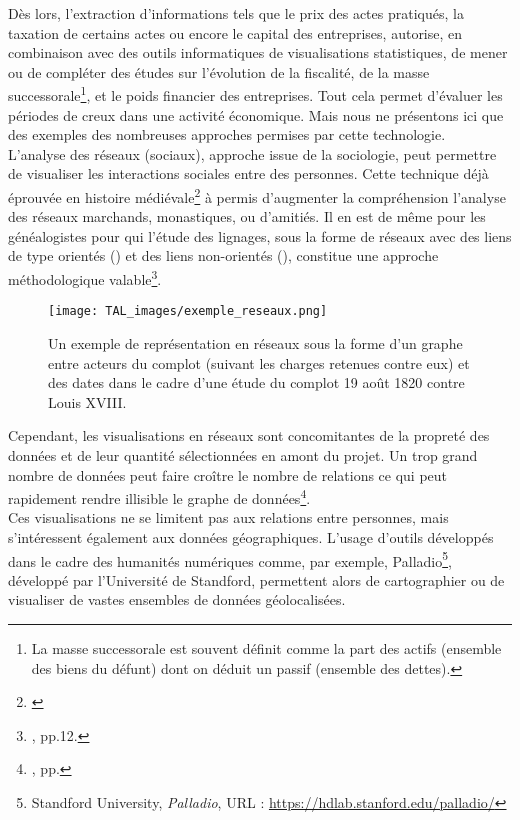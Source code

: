 Dès lors, l'extraction d'informations tels que le prix des actes pratiqués, la taxation de certains actes ou encore le capital des entreprises, autorise, en combinaison avec des outils informatiques de visualisations statistiques, de mener ou de compléter des études sur l'évolution de la fiscalité, de la masse successorale\footnote{La masse successorale est souvent définit comme la part des actifs (ensemble des biens du défunt) dont on déduit un passif (ensemble des dettes).}, et le poids financier des entreprises. Tout cela permet d'évaluer les périodes de creux dans une activité économique. Mais nous ne présentons ici que des exemples des nombreuses approches permises par cette technologie.\\

L'analyse des réseaux (sociaux), approche issue de la sociologie, peut permettre de visualiser les interactions sociales entre des personnes. Cette technique déjà éprouvée en histoire médiévale\footnote{\cite{jegou_potentialites_2017}} à permis d'augmenter la compréhension l'analyse des réseaux marchands, monastiques, ou d'amitiés. Il en est de même pour les généalogistes pour qui l'étude des lignages, sous la forme de réseaux avec des liens de type orientés () et des liens non-orientés (), constitue une approche méthodologique valable\footnote{\cite{beauguitte_analyse_2016}, pp.12.}.\\

\begin{figure}[h]
    \texttt{[image: TAL\_images/exemple\_reseaux.png]}
    \caption{Un exemple de représentation en réseaux sous la forme d'un graphe entre acteurs du complot (suivant les charges retenues contre eux) et des dates dans le cadre d'une étude du complot 19 août 1820 contre Louis XVIII. \textcopyright\cite{faraut_les_2015}}
    \label{fig:reseaux_graph_medieval}
\end{figure}
\newpage

Cependant, les visualisations en réseaux sont concomitantes de la propreté des données et de leur quantité sélectionnées en amont du projet. Un trop grand nombre de données peut faire croître le nombre de relations ce qui peut rapidement rendre illisible le graphe de données\footnote{\cite{beauguitte_analyse_2016}, pp.}.\\

Ces visualisations ne se limitent pas aux relations entre personnes, mais s'intéressent également aux données géographiques. L'usage d'outils développés dans le cadre des humanités numériques comme, par exemple, Palladio\footnote{Standford University, \textit{Palladio}, URL :  \url{https://hdlab.stanford.edu/palladio/}}, développé par l'Université de Standford, permettent alors de cartographier ou de visualiser de vastes ensembles de données géolocalisées.\\

